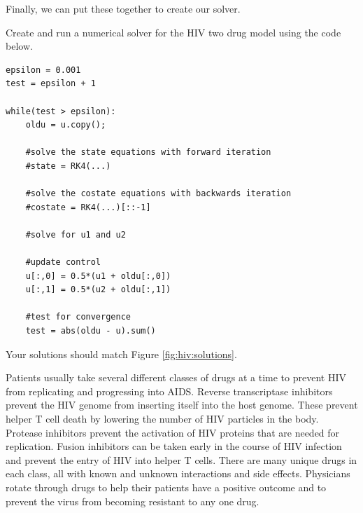 Finally, we can put these together to create our solver.
\begin{problem}
Create and run a numerical solver for the HIV two drug model using the code below.

\begin{lstlisting}
epsilon = 0.001
test = epsilon + 1

while(test > epsilon):
	oldu = u.copy();
    
	#solve the state equations with forward iteration
	#state = RK4(...)
    
	#solve the costate equations with backwards iteration
	#costate = RK4(...)[::-1]
	
	#solve for u1 and u2
    
	#update control
	u[:,0] = 0.5*(u1 + oldu[:,0])
	u[:,1] = 0.5*(u2 + oldu[:,1])

	#test for convergence
	test = abs(oldu - u).sum()
\end{lstlisting}

Your solutions should match Figure \ref{fig:hiv:solutions}.
\label{problem:hiv:solver}

\label{problem:hiv:numericalsolver}
\end{problem}

Patients usually take several different classes of drugs at a time to prevent HIV from replicating and progressing into AIDS. Reverse transcriptase inhibitors prevent the HIV genome from inserting itself into the host genome. These prevent helper T cell death by lowering the number of HIV particles in the body. Protease inhibitors prevent the activation of HIV proteins that are needed for replication. Fusion inhibitors can be taken early in the course of HIV infection and prevent the entry of HIV into helper T cells. 
There are many unique drugs in each class, all with known and unknown interactions and side effects. Physicians rotate through drugs to help their patients have a positive outcome and to prevent the virus from becoming resistant to any one drug.

%
%

